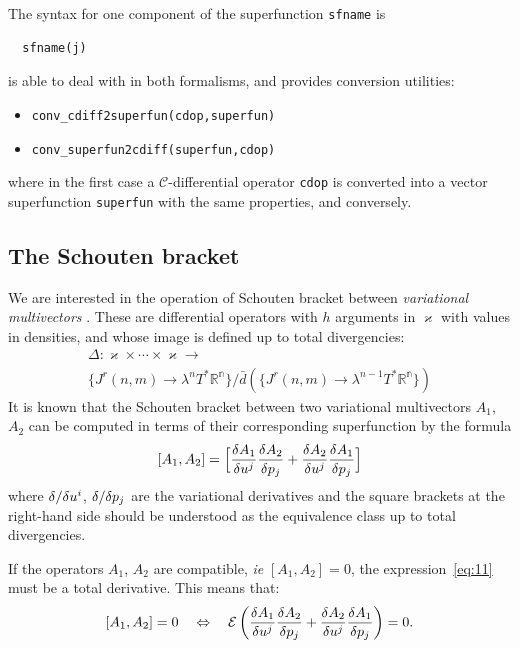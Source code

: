 The syntax for one component of the superfunction \texttt{sfname} is
\begin{verbatim}
  sfname(j)
\end{verbatim}

\cde is able to deal with \cdiffops in both formalisms, and provides
conversion utilities:
\hypertarget{operator:CONV_CDIFF2SUPERFUN}{}
\hypertarget{operator:CONV_SUPERFUN2CDIFF}{}
\begin{itemize}
\item \texttt{conv\_cdiff2superfun(cdop,superfun)}
\item \texttt{conv\_superfun2cdiff(superfun,cdop)}
\end{itemize}
where in the first case a $\mathcal{C}$-differential operator \texttt{cdop} is
converted into a vector superfunction \texttt{superfun} with the same
properties, and conversely.

\subsection{The Schouten bracket}
\label{cdesec:schouten-bracket}

We are interested in the operation of Schouten bracket between
\emph{variational multivectors} \cite{IgoninVerbovetskyVitolo:2004}. These are differential operators
with $h$ arguments in $\varkappa$ with values in densities, and whose image is
defined up to total divergencies:
\begin{multline}
  \label{eq:16}
  \Delta\colon \varkappa\times\cdots\times \varkappa \to
  \\
  \{J^r(n,m) \to \lambda^nT^*\mathbb{R^n}\}/
  \bar{d}(\{J^r(n,m) \to \lambda^{n-1} T^*\mathbb{R^n}\})
\end{multline}
It is known \cite{Getzler:2002,KerstenKrasilshchikVerboretsky:2004} that the Schouten bracket between two variational
multivectors $A_1$, $A_2$ can be computed in terms of their corresponding
superfunction by the formula
\begin{equation}\label{eq:11}
  [A_1,A_2] = \Big[\fd{A_1}{u^j}\fd{A_2}{p_j} + \fd{A_2}{u^j}\fd{A_1}{p_j}\Big]
\end{equation}
where $\fd{}{u^i}$, $\fd{}{p_j}$ are the variational derivatives and
the square brackets at the right-hand side should be understood as the
equivalence class up to total divergencies.

If the operators $A_1$, $A_2$ are compatible, \emph{ie} $[A_1,A_2]=0$, the
expression~\eqref{eq:11} must be a total derivative. This means that:
\begin{equation}
  \label{eq:14}
  [A_1,A_2] = 0 \quad\Leftrightarrow\quad
  \mathcal{E}\left(\fd{A_1}{u^j}\fd{A_2}{p_j} +
    \fd{A_2}{u^j}\fd{A_1}{p_j}\right)=0.
\end{equation}

